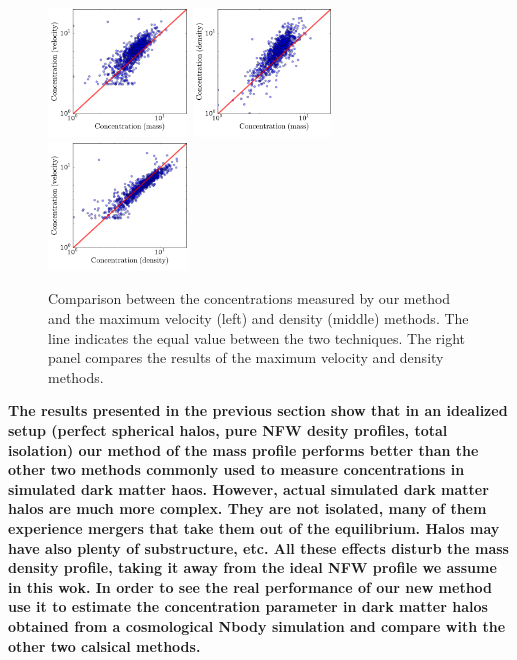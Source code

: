 \documentclass[a4,useAMS,usenatbib,usegraphicx]{mn2e}
\begin{document}
\label{sec:data}
\begin{figure}
  \begin{center}
    \includegraphics[width=0.33\textwidth]{conc_mass_vel.pdf}
    \includegraphics[width=0.33\textwidth]{conc_mass_dens.pdf}
    \includegraphics[width=0.33\textwidth]{conc_dens_vel.pdf}
  \end{center}
  \caption{Comparison between the concentrations measured by our
    method and the maximum velocity (left) and density (middle)
    methods. The line indicates the equal value between the two
    techniques. The right panel compares the results of the maximum
    velocity and density methods.
  \label{fig:mdv}}
\end{figure}


{\bf The results presented in the previous section show that in an
  idealized setup (perfect spherical halos, pure NFW desity profiles,
  total isolation) our method of the mass profile performs better than
  the other two methods commonly used to measure concentrations in
  simulated dark matter haos. However, actual simulated dark matter
  halos are much more complex. They are not isolated, many of them
  experience mergers that take them out of the equilibrium. Halos may
  have also plenty of substructure, etc. All these effects disturb the
  mass density profile, taking it away from the ideal NFW profile we
  assume in this wok. In order to see the real performance of our new
  method use it to estimate the concentration parameter in dark matter
  halos obtained from a cosmological Nbody simulation and compare with
  the other two calsical methods.}
\end{document}

